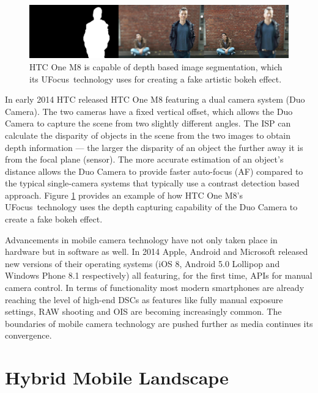 \documentclass[thesis.tex]{subfiles}
\begin{document}
\begin{figure}[ht]
\centering \includegraphics[width=\textwidth]{images/htc-ufocus.jpg}
\caption{HTC One M8 is capable of depth based image segmentation, which its UFocus\texttrademark\ technology uses for creating a fake artistic bokeh effect.\label{figure:htc-ufocus}}
\end{figure}

In early 2014 HTC released HTC One M8 featuring a dual camera system (Duo Camera). The two cameras have a fixed vertical offset, which allows the Duo Camera to capture the scene from two slightly different angles. The ISP can calculate the disparity of objects in the scene from the two images to obtain depth information --- the larger the disparity of an object the further away it is from the focal plane (sensor). The more accurate estimation of an object's distance allows the Duo Camera to provide faster auto-focus (AF) compared to the typical single-camera systems that typically use a contrast detection based approach. Figure \ref{figure:htc-ufocus} provides an example of how HTC One M8's UFocus\texttrademark\ technology uses the depth capturing capability of the Duo Camera to create a fake bokeh effect.

Advancements in mobile camera technology have not only taken place in hardware but in software as well. In 2014 Apple, Android and Microsoft released new versions of their operating systems (iOS 8, Android 5.0 Lollipop and Windows Phone 8.1 respectively) all featuring, for the first time, APIs for manual camera control. In terms of functionality most modern smartphones are already reaching the level of high-end DSCs as features like fully manual exposure settings, RAW shooting and OIS are becoming increasingly common. The boundaries of mobile camera technology are pushed further as media continues its convergence.

\section{Hybrid Mobile Landscape}
\end{document}
